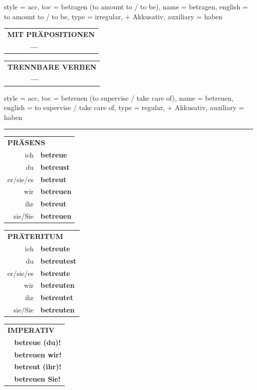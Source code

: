 \begin{verbentry}{
  style = {acc},
  toc = {betragen (to amount to / to be)},
  name = {betragen},
  english = {to amount to / to be},
  type = {irregular, + Akkusativ},
  auxiliary = {haben}
}
\vspace{10pt}

\begin{tabular}{lll}
\multicolumn{3}{l}{\textbf{MIT PRÄPOSITIONEN}}\\
& \textbf{---} & \\
\end{tabular}
\hfill
\begin{tabular}{lll}
\multicolumn{3}{l}{\textbf{TRENNBARE VERBEN}}\\
& \textbf{---} & \\
\end{tabular}
\vspace{-5pt}
\end{verbentry}

\begin{verbentry}{
  style = {acc},
  toc = {betreuen (to supervise / take care of)},
  name = {betreuen},
  english = {to supervise / take care of},
  type = {regular, + Akkusativ},
  auxiliary = {haben}
}


\vspace{5pt}
\hrule
\vspace{5pt}

\begin{tabular}{rl}
\multicolumn{2}{l}{\textbf{PRÄSENS}}\\
ich & \textbf{betreue}\\
du & \textbf{betreust}\\
er/sie/es & \textbf{betreut}\\
wir & \textbf{betreuen}\\
ihr & \textbf{betreut}\\
sie/Sie & \textbf{betreuen}\\
\end{tabular}
\hfill
\begin{tabular}{rl}
\multicolumn{2}{l}{\textbf{PRÄTERITUM}}\\
ich & \textbf{betreute}\\
du & \textbf{betreutest}\\
er/sie/es & \textbf{betreute}\\
wir & \textbf{betreuten}\\
ihr & \textbf{betreutet}\\
sie/Sie & \textbf{betreuten}\\
\end{tabular}
\hfill
\begin{tabular}{rl}
\multicolumn{2}{l}{\textbf{IMPERATIV}}\\
& \textbf{betreue (du)!}\\
& \textbf{betreuen wir!}\\
& \textbf{betreut (ihr)!}\\
& \textbf{betreuen Sie!}\\
\end{tabular}


\end{verbentry}
